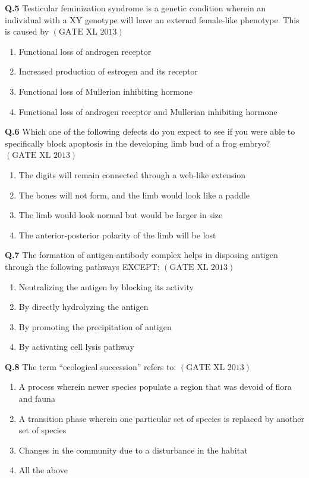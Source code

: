 \documentclass[12pt]{article}
\theoremstyle{remark}
\providecommand{\brak}[1]{\ensuremath{\left(#1\right)}}
\begin{document}
\textbf{Q.5} Testicular feminization syndrome is a genetic condition wherein an individual with a XY genotype will have an external female-like phenotype. This is caused by \hfill $\brak{\text{GATE XL 2013}}$
\begin{enumerate}
    \item Functional loss of androgen receptor
    \item Increased production of estrogen and its receptor
    \item Functional loss of Mullerian inhibiting hormone
    \item Functional loss of androgen receptor and Mullerian inhibiting hormone
\end{enumerate}

\textbf{Q.6} Which one of the following defects do you expect to see if you were able to specifically block apoptosis in the developing limb bud of a frog embryo? \hfill $\brak{\text{GATE XL 2013}}$
\begin{enumerate}
    \item The digits will remain connected through a web-like extension
    \item The bones will not form, and the limb would look like a paddle
    \item The limb would look normal but would be larger in size
    \item The anterior-posterior polarity of the limb will be lost
\end{enumerate}

\textbf{Q.7} The formation of antigen-antibody complex helps in disposing antigen through the following pathways EXCEPT: \hfill $\brak{\text{GATE XL 2013}}$
\begin{enumerate}
    \item Neutralizing the antigen by blocking its activity
    \item By directly hydrolyzing the antigen
    \item By promoting the precipitation of antigen
    \item By activating cell lysis pathway
\end{enumerate}

\textbf{Q.8} The term “ecological succession” refers to: \hfill $\brak{\text{GATE XL 2013}}$
\begin{enumerate}
    \item A process wherein newer species populate a region that was devoid of flora and fauna
    \item A transition phase wherein one particular set of species is replaced by another set of species
    \item Changes in the community due to a disturbance in the habitat
    \item All the above
\end{enumerate}
\end{document}

